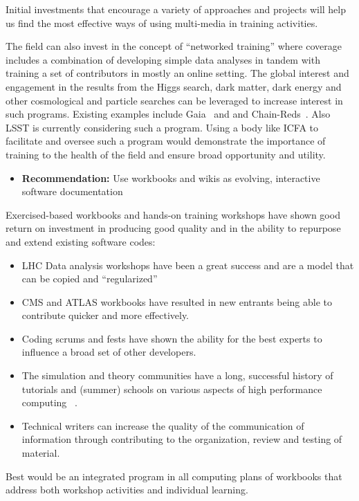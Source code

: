 Initial investments that encourage a variety of approaches and
projects will help us find the most effective ways of using multi-media
in training activities.

The field can also invest in the concept  of ``networked training''
where coverage includes  a combination of developing simple data
analyses in tandem with training a set of contributors in mostly
an online setting. The global interest and engagement in the results
from the Higgs search, dark matter, dark energy and other cosmological
and particle searches can be leveraged to increase interest in such
programs.  Existing examples include Gaia~\cite{GAIA} and and
Chain-Reds~\cite{CHAINREDS}. Also LSST is currently considering
such a program. Using a body like ICFA to facilitate and oversee
such a program would demonstrate the importance of training to the
health of the field and ensure broad  opportunity and utility.

\begin{itemize}
\item[] {\bf Recommendation:} Use workbooks and wikis as evolving, interactive software documentation
\end{itemize}

Exercised-based workbooks and hands-on training workshops have shown
good return on investment in producing good quality and in the
ability to repurpose and extend  existing software codes:
\begin{itemize}
\item LHC Data analysis workshops have been a great success and are a model that can be copied and ``regularized''
\item CMS and ATLAS workbooks have resulted in new entrants being able to contribute quicker and more effectively.
\item Coding scrums and fests have shown the ability for the best experts to influence a broad set of other developers.
\item The simulation and theory communities have a long, successful history of tutorials and (summer) schools on various aspects of high performance computing ~\cite{HPCTraining}.
\item Technical writers can increase the quality of the communication of information through contributing to the organization, review and testing of material.
\end{itemize}

Best would be an integrated program in all computing plans of workbooks that address both workshop activities and individual learning.


